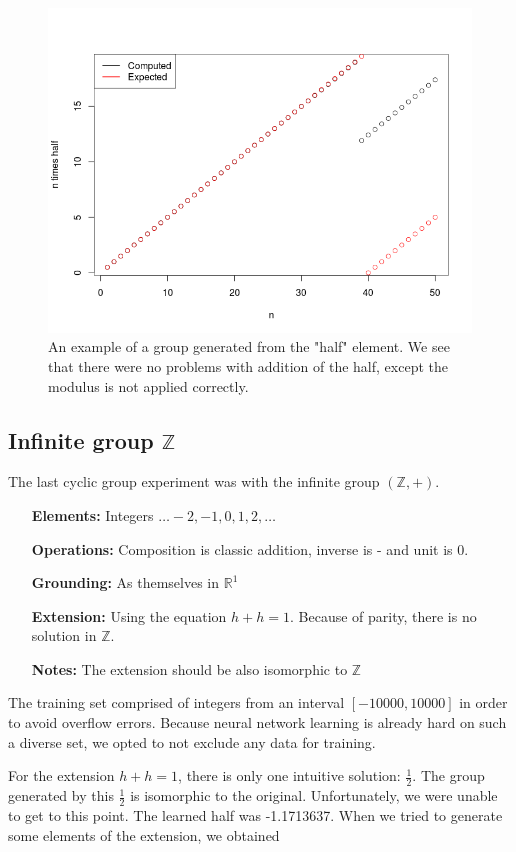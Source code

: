\begin{figure}[h]
\centering
\caption{An example of a group generated from the "half" element. We see that there were no problems with addition of the half, except the modulus is not applied correctly.}
\label{graph:z20_half_generator}
\includegraphics[width=0.8\linewidth]{../img/z20_half_plot.png}
\end{figure}

\subsection{Infinite group $\mathbb{Z}$}
The last cyclic group experiment was with the infinite group $(\mathbb{Z},+)$.

\begin{itemize}
	\item[\textbf{Elements:}] Integers $\dots-2,-1,0,1,2,\dots$
	\item[\textbf{Operations:}] Composition is classic addition, inverse is - and unit is 0.
	\item[\textbf{Grounding:}] As themselves in $\mathbb{R}^1$
	\item[\textbf{Extension:}] Using the equation $h+h=1$. Because of parity, there is no solution in $\mathbb{Z}$.
	\item[\textbf{Notes:}] The extension should be also isomorphic to $\mathbb{Z}$
\end{itemize}

 The training set comprised of integers from an interval $[-10000,10000]$ in order to avoid overflow errors. Because neural network learning is already hard on such a diverse set, we opted to not exclude any data for training.

For the extension $h+h=1$, there is only one intuitive solution: $\frac{1}{2}$. The group generated by this $\frac{1}{2}$ is isomorphic to the original. Unfortunately, we were unable to get to this point. The learned half was 
-1.1713637. When we tried to generate some elements of the extension, we obtained

